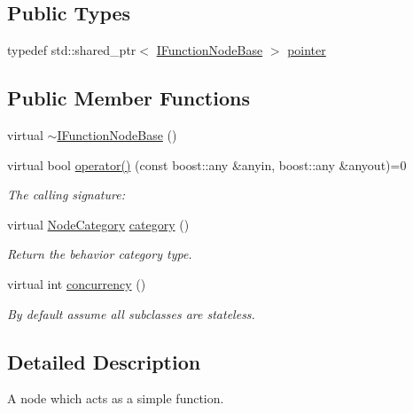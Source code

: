 \subsection*{Public Types}
\begin{DoxyCompactItemize}
\item 
typedef std\+::shared\+\_\+ptr$<$ \hyperlink{class_wire_cell_1_1_i_function_node_base}{I\+Function\+Node\+Base} $>$ \hyperlink{class_wire_cell_1_1_i_function_node_base_a8c48cb6d791f15206f0d00fed70e05f3}{pointer}
\end{DoxyCompactItemize}
\subsection*{Public Member Functions}
\begin{DoxyCompactItemize}
\item 
virtual \hyperlink{class_wire_cell_1_1_i_function_node_base_aca515a5de2dabccf0e02f967fd2fb0ca}{$\sim$\+I\+Function\+Node\+Base} ()
\item 
virtual bool \hyperlink{class_wire_cell_1_1_i_function_node_base_a8928d96f5d2030a52a490cf1d71c096f}{operator()} (const boost\+::any \&anyin, boost\+::any \&anyout)=0
\begin{DoxyCompactList}\small\item\em The calling signature\+: \end{DoxyCompactList}\item 
virtual \hyperlink{class_wire_cell_1_1_i_node_a5546e64cbb70bd3ac787295cac9ac803}{Node\+Category} \hyperlink{class_wire_cell_1_1_i_function_node_base_aea2adac35fc9aa54a82525ccb32471f7}{category} ()
\begin{DoxyCompactList}\small\item\em Return the behavior category type. \end{DoxyCompactList}\item 
virtual int \hyperlink{class_wire_cell_1_1_i_function_node_base_a19383abea731c6cbafc88fb9ffe11ee9}{concurrency} ()
\begin{DoxyCompactList}\small\item\em By default assume all subclasses are stateless. \end{DoxyCompactList}\end{DoxyCompactItemize}


\subsection{Detailed Description}
A node which acts as a simple function. 

